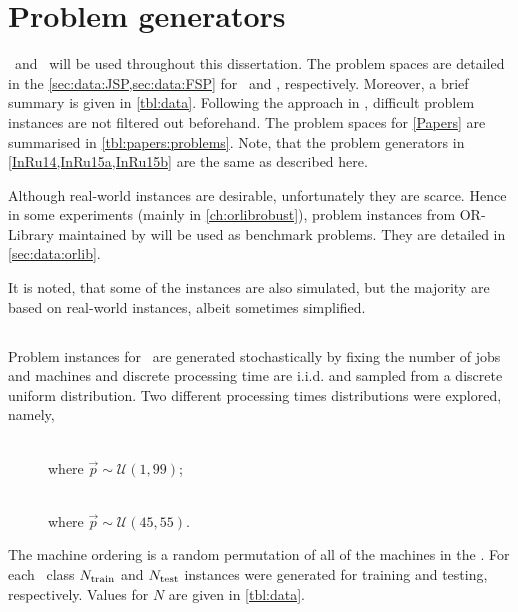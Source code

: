 
\chapter{Problem generators}\label{ch:genprobleminstances} 

 \JSP\ and \FSP\  will be used  throughout this dissertation. The  problem spaces are detailed in the \cref{sec:data:JSP,sec:data:FSP} for \JSP\ and \FSP, respectively. Moreover, a brief summary is given in \cref{tbl:data}.
Following the approach in \citet{Whitley}, difficult problem instances are not 
filtered out beforehand. %
The problem spaces for \cref{Papers} are summarised in 
\cref{tbl:papers:problems}. Note, that the problem generators in 
\cref{InRu14,InRu15a,InRu15b} are the same as described here.



Although real-world instances are desirable, unfortunately they are scarce. 
Hence in some experiments (mainly in \cref{ch:orlibrobust}), problem instances 
from OR-Library maintained by \citet{ORlibrary} will be used as benchmark 
problems. They are detailed in \cref{sec:data:orlib}. 

It is noted, that some of the instances are also simulated, but the majority 
are based on real-world instances, albeit sometimes simplified. 

\section{\Jsp}\label{sec:data:JSP}
Problem instances for \JSP\ are generated stochastically by fixing the number of jobs and machines and 
discrete processing time are i.i.d. and sampled from a discrete uniform distribution. %
Two different processing times distributions were explored, namely,
\begin{description}
	\item[\Jrnd]  \hfill \\ where $\vec{p}\sim\mathcal{U}(1,99)$;
	\item[\Jrndn]  \hfill \\ where $\vec{p}\sim\mathcal{U}(45,55)$.
\end{description}
The machine ordering is a random permutation of all of the machines in the \jsp. 
For each \JSP\ class $N_{\text{train}}$  and $N_{\text{test}}$ instances were 
generated for training and testing, respectively. Values for $N$ are given in 
\cref{tbl:data}. 

